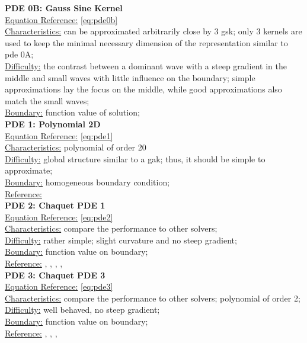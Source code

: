 \documentclass[./\jobname.tex]{subfiles}
\begin{document}
\textbf{PDE 0B: Gauss Sine Kernel} \\
\underline{Equation Reference:} \eqref{eq:pde0b} \\
\underline{Characteristics:} can be approximated arbitrarily close by 3 \gls{gsk}; only 3 kernels are used to keep the minimal necessary dimension of the representation similar to \gls{pde} 0A;\\
\underline{Difficulty:} the contrast between a dominant wave with a steep gradient in the middle and small waves with little influence on the boundary; simple approximations lay the focus on the middle, while good approximations also match the small waves; \\
\underline{Boundary:} function value of solution; \\

\textbf{PDE 1: Polynomial 2D} \\
\underline{Equation Reference:} \eqref{eq:pde1} \\
\underline{Characteristics:} polynomial of order 20 \\
\underline{Difficulty:} global structure similar to a \gls{gak}; thus, it should be simple to approximate; \\
\underline{Boundary:} homogeneous boundary condition; \\
\underline{Reference:} \cite{mitchell_nist_2018} \\

\textbf{PDE 2: Chaquet PDE 1} \\
\underline{Equation Reference:} \eqref{eq:pde2} \\
\underline{Characteristics:} compare the performance to other solvers; \\
\underline{Difficulty:} rather simple; slight curvature and no steep gradient; \\
\underline{Boundary:} function value on boundary; \\
\underline{Reference:} \cite{chaquet_using_2019}, \cite{chaquet_solving_2012}, \cite{tsoulos_solving_2006}, \cite{sobester_genetic_2008}, \cite{panagant_solving_2014}\\

\textbf{PDE 3: Chaquet PDE 3} \\
\underline{Equation Reference:} \eqref{eq:pde3} \\
\underline{Characteristics:} compare the performance to other solvers; polynomial of order 2; \\
\underline{Difficulty:} well behaved, no steep gradient; \\
\underline{Boundary:} function value on boundary; \\
\underline{Reference:} \cite{chaquet_using_2019}, \cite{chaquet_solving_2012}, \cite{tsoulos_solving_2006}, \cite{panagant_solving_2014} \\
\end{document}
